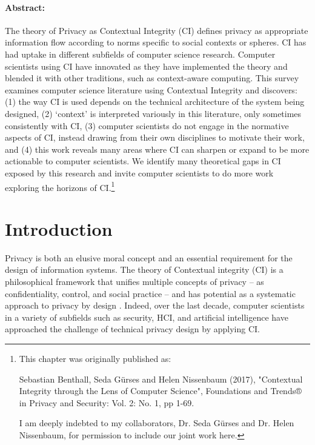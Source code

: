 \documentclass[../thesis.tex]{subfiles}
\begin{document}
 \paragraph{Abstract:}
 The theory of Privacy as Contextual Integrity (CI) defines
 privacy as appropriate information flow according to norms
 specific to social contexts or spheres.
 CI has had uptake in different subfields of
 computer science research. Computer scientists using CI
 have innovated as they have implemented the theory and
 blended it with other traditions, such as context-aware
 computing. This survey examines
 computer science literature using Contextual Integrity and
 discovers:  (1) the way CI is used depends on the technical
 architecture of the system being designed, (2) `context' is
 interpreted variously in this literature, only sometimes
 consistently with CI, (3) computer scientists do not engage
 in the normative aspects of CI, instead drawing from their
 own disciplines to motivate their work, and (4) this work
 reveals many areas where CI can sharpen or expand to be
 more actionable to computer scientists. We identify many
 theoretical gaps in CI exposed by this research and invite
 computer scientists to do more work exploring the horizons
 of CI.\footnote{This chapter was originally published as:

 Sebastian Benthall, Seda G{\"u}rses and Helen Nissenbaum (2017), "Contextual Integrity through the Lens of Computer Science", Foundations and Trends® in Privacy and Security: Vol. 2: No. 1, pp 1-69.

 I am deeply indebted to my collaborators, Dr. Seda G{\"u}rses and Dr. Helen Nissenbaum, for permission to include our joint work here.}
 

\section{Introduction}
\label{CI1}

Privacy is both an elusive moral concept and an essential requirement
for the design of information systems. The theory of Contextual
integrity (CI) is a philosophical framework that unifies multiple
concepts of privacy -- as confidentiality, control, and social
practice \citep{gurses2013two} -- and has potential as a
systematic approach to privacy by design \citep{nissenbaum2009privacy}. Indeed,
over the last decade, computer scientists in a variety of subfields
such as security, HCI, and artificial intelligence have approached the
challenge of technical privacy design by applying CI.
\end{document}
